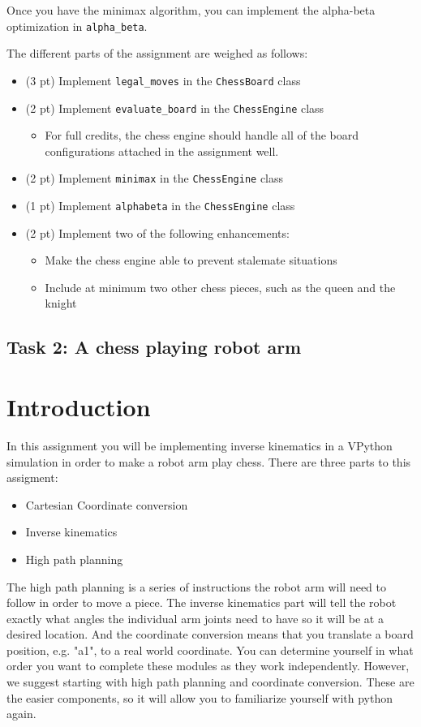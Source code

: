 \documentclass[10pt]{scrartcl}
\begin{document}
Once you have the minimax algorithm, you can implement the alpha-beta optimization in \texttt{alpha\_beta}.

The different parts of the assignment are weighed as follows:
\begin{itemize}
    \item (3 pt) Implement \texttt{legal\_moves} in the \texttt{ChessBoard} class
    \item (2 pt) Implement \texttt{evaluate\_board} in the \texttt{ChessEngine} class
        \begin{itemize}
            \item For full credits, the chess engine should handle all of the board configurations attached in the assignment well.
        \end{itemize}
    \item (2 pt) Implement \texttt{minimax} in the \texttt{ChessEngine} class
    \item (1 pt) Implement \texttt{alphabeta} in the \texttt{ChessEngine} class
    \item (2 pt) Implement two of the following enhancements:
        \begin{itemize}           
            \item Make the chess engine able to prevent stalemate situations
            \item Include at minimum two other chess pieces, such as the queen and the knight
        \end{itemize}
\end{itemize}

\subsection{Task 2: A chess playing robot arm}
\label{sec:Inversekinematics}

\section*{Introduction}

In this assignment you will be implementing inverse kinematics in a VPython simulation in order to make a robot arm play chess. There are three parts to this assigment:
\begin{itemize}
    \item Cartesian Coordinate conversion
    \item Inverse kinematics
    \item High path planning    
\end{itemize}
The high path planning is a series of instructions the robot arm will need to follow in order to move a piece. The inverse kinematics part will tell the robot exactly what angles the individual arm joints need to have so it will be at a desired location. And the coordinate conversion means that you translate a board position, e.g. "a1", to a real world coordinate. You can determine yourself in what order you want to complete these modules as they work independently. However, we suggest starting with high path planning and coordinate conversion. These are the easier components, so it will allow you to familiarize yourself with python again.
\end{document}
